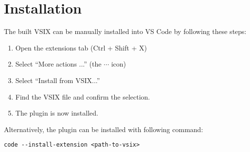 \section{Installation}
The built VSIX can be manually installed into VS Code by following these steps:
\begin{enumerate}
	\item Open the extensions tab (Ctrl + Shift + X)
	\item Select ``More actions ...'' (the $\cdots$ icon)
	\item Select ``Install from VSIX...''
	\item Find the VSIX file and confirm the selection.
	\item The plugin is now installed.
\end{enumerate}

Alternatively, the plugin can be installed with following command:
\begin{verbatim}
code --install-extension <path-to-vsix>
\end{verbatim}

